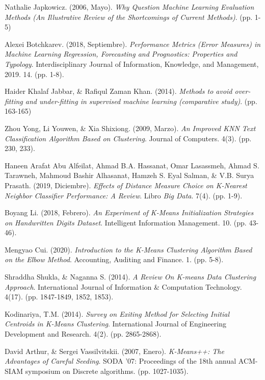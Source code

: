 \documentclass[12pt,a4paper]{article}
\begin{document}
\begin{sloppypar}
\begin{thebibliography}{9}
Nathalie Japkowicz. (2006, Mayo). \textit{Why Question Machine Learning Evaluation Methods (An Illustrative Review of the Shortcomings of Current Methods)}. (pp. 1-5)

Alexei Botchkarev. (2018, Septiembre). \textit{Performance Metrics (Error Measures) in Machine Learning Regression, Forecasting and Prognostics: Properties and Typology}. Interdisciplinary Journal of Information, Knowledge, and Management, 2019. 14. (pp. 1-8).

Haider Khalaf Jabbar, \& Rafiqul Zaman Khan. (2014). \textit{Methods to avoid over-fitting and under-fitting in supervised machine learning (comparative study)}. (pp. 163-165)

Zhou Yong,  Li Youwen, \& Xia Shixiong. (2009, Marzo). \textit{An Improved KNN Text Classification Algorithm Based on Clustering}. Journal of Computers. 4(3). (pp. 230, 233). 

Haneen Arafat Abu Alfeilat, Ahmad B.A. Hassanat, Omar Lasassmeh, Ahmad S. Tarawneh, Mahmoud Bashir Alhasanat, Hamzeh S. Eyal Salman, \& V.B. Surya Prasath. (2019, Diciembre). \textit{Effects of Distance Measure Choice on K-Nearest Neighbor Classifier Performance: A Review}. Libro \textit{Big Data}. 7(4). (pp. 1-9).

Boyang Li. (2018, Febrero). \textit{An Experiment of K-Means Initialization Strategies on Handwritten Digits Dataset}. Intelligent Information Management. 10. (pp. 43-46). 

Mengyao Cui. (2020). \textit{Introduction to the K-Means Clustering Algorithm Based on the Elbow Method}. Accounting, Auditing and Finance. 1. (pp. 5-8).

Shraddha Shukla, \& Naganna S. (2014). \textit{A Review On K-means Data Clustering Approach}. International Journal of Information \& Computation Technology. 4(17). (pp. 1847-1849, 1852, 1853).

Kodinariya, T.M. (2014). \textit{Survey on Exiting Method for Selecting Initial Centroids in K-Means Clustering}. International Journal of Engineering Development and Research. 4(2). (pp. 2865-2868).

David Arthur, \& Sergei Vassilvitskii. (2007, Enero). \textit{K-Means++: The Advantages of Careful Seeding}. SODA '07: Proceedings of the 18th annual ACM-SIAM symposium on Discrete algorithms. (pp. 1027-1035).


\end{thebibliography}
\end{sloppypar}
\end{document}
